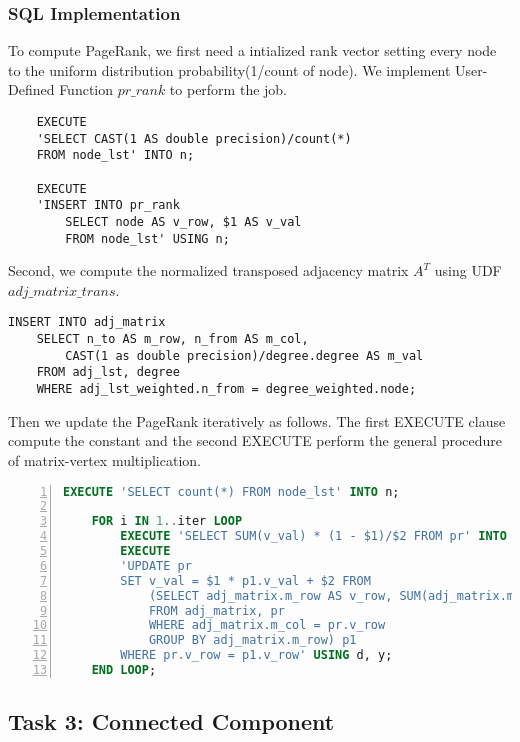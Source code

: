 \subsubsection{SQL Implementation}
To compute PageRank, we first need a intialized rank vector setting every node to the uniform distribution probability(1/count of node).
We implement User-Defined Function $pr\_rank$ to perform the job.
\begin{verbatim}
	EXECUTE 
	'SELECT CAST(1 AS double precision)/count(*) 
	FROM node_lst' INTO n;

	EXECUTE
	'INSERT INTO pr_rank 
		SELECT node AS v_row, $1 AS v_val 
		FROM node_lst' USING n;
\end{verbatim}
Second, we compute the normalized transposed adjacency matrix $A^T$ using UDF $adj\_matrix\_trans$.
\begin{verbatim}
INSERT INTO adj_matrix 
	SELECT n_to AS m_row, n_from AS m_col, 
		CAST(1 as double precision)/degree.degree AS m_val 
	FROM adj_lst, degree
	WHERE adj_lst_weighted.n_from = degree_weighted.node;
\end{verbatim}
Then we update the PageRank iteratively as follows. The first EXECUTE clause compute the constant and the second EXECUTE perform the general procedure of matrix-vertex multiplication.
\begin{lstlisting}[caption=PageRank, label=pr, language=SQL, numbers=left, numberstyle=\tiny, breaklines, tabsize=2, frame=single, keepspaces=false]
	EXECUTE 'SELECT count(*) FROM node_lst' INTO n;
	
	FOR i IN 1..iter LOOP
		EXECUTE 'SELECT SUM(v_val) * (1 - $1)/$2 FROM pr' INTO y USING d, n;
		EXECUTE
		'UPDATE pr
		SET v_val = $1 * p1.v_val + $2 FROM 
			(SELECT adj_matrix.m_row AS v_row, SUM(adj_matrix.m_val * pr.v_val) AS v_val
			FROM adj_matrix, pr
			WHERE adj_matrix.m_col = pr.v_row
			GROUP BY adj_matrix.m_row) p1
		WHERE pr.v_row = p1.v_row' USING d, y;
	END LOOP;
\end{lstlisting}

\subsection{Task 3: Connected Component}
